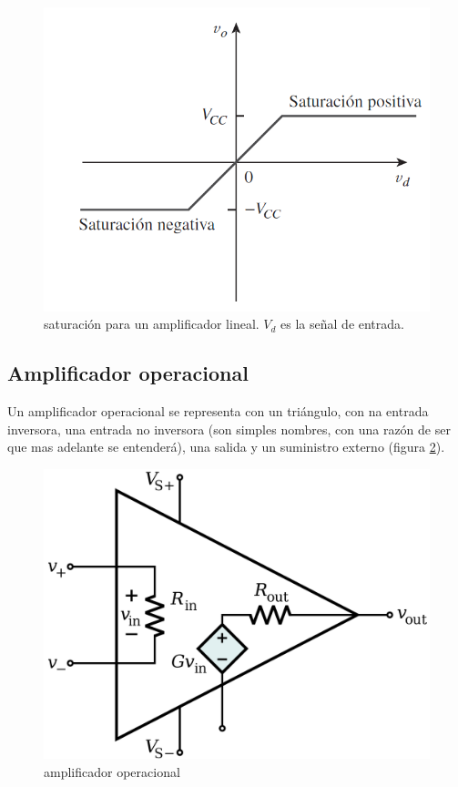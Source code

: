 \documentclass[11pt]{article} %
\begin{document}
\begin{figure}[h!] \centering
\includegraphics[scale=0.5]{0.Saturacion}
\caption{saturación para un amplificador lineal. $V_d$ es la señal de entrada.}
\label{Fig:1.1-Saturacion}
\end{figure}




\subsection{Amplificador operacional}

Un amplificador operacional se representa con un triángulo, con na entrada inversora, una entrada no inversora (son simples nombres, con una razón de ser que mas adelante se entenderá), una salida y un suministro externo (figura \ref{Fig:1.2-Amplificador}). \\


\begin{figure}[h!] \centering
\includegraphics[scale=0.10]{1.2-Amplificador.png}
\caption{amplificador operacional}
\label{Fig:1.2-Amplificador}
\end{figure}
\end{document}
